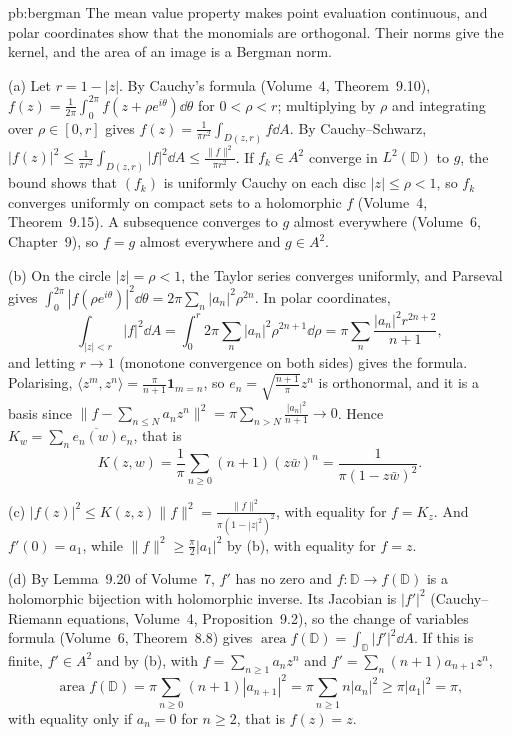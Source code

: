 \begin{solution}{pb:bergman}
\idea The mean value property makes point evaluation continuous, and polar coordinates show that the monomials are orthogonal. Their norms give the kernel, and the
area of an image is a Bergman norm.

\writeup (a) Let $r=1-|z|$. By Cauchy's formula (Volume~4, Theorem~9.10), $f(z)=\frac1{2\pi}\int_0^{2\pi}f(z+\rho e^{i\theta})\dd\theta$ for $0<\rho<r$; multiplying by $\rho$ and
integrating over $\rho\in[0,r]$ gives $f(z)=\frac1{\pi r^2}\int_{D(z,r)}f\dd A$. By Cauchy--Schwarz, $|f(z)|^2\le\frac1{\pi r^2}\int_{D(z,r)}|f|^2\dd A\le\frac{\|f\|^2}{\pi r^2}$. If
$f_k\in A^2$ converge in $L^2(\mathbb D)$ to $g$, the bound shows that $(f_k)$ is uniformly Cauchy on each disc $|z|\le\rho<1$, so $f_k$ converges uniformly on compact sets to a
holomorphic $f$ (Volume~4, Theorem~9.15). A subsequence converges to $g$ almost everywhere (Volume~6, Chapter~9), so $f=g$ almost everywhere and $g\in A^2$.

(b) On the circle $|z|=\rho<1$, the Taylor series converges uniformly, and Parseval gives $\int_0^{2\pi}|f(\rho e^{i\theta})|^2\dd\theta=2\pi\sum_n|a_n|^2\rho^{2n}$. In polar
coordinates,
\[
\int_{|z|<r}|f|^2\dd A=\int_0^r2\pi\sum_n|a_n|^2\rho^{2n+1}\dd\rho=\pi\sum_n\frac{|a_n|^2r^{2n+2}}{n+1},
\]
and letting $r\to1$ (monotone convergence on both sides) gives the formula. Polarising, $\langle z^m,z^n\rangle=\frac\pi{n+1}\mathbf 1_{m=n}$, so $e_n=\sqrt{\frac{n+1}\pi}z^n$ is orthonormal,
and it is a basis since $\|f-\sum_{n\le N}a_nz^n\|^2=\pi\sum_{n>N}\frac{|a_n|^2}{n+1}\to0$. Hence $K_w=\sum_n\overline{e_n(w)}e_n$, that is
\[
K(z,w)=\frac1\pi\sum_{n\ge0}(n+1)(z\bar w)^n=\frac1{\pi(1-z\bar w)^2}.
\]

(c) $|f(z)|^2\le K(z,z)\|f\|^2=\frac{\|f\|^2}{\pi(1-|z|^2)^2}$, with equality for $f=K_z$. And $f'(0)=a_1$, while $\|f\|^2\ge\frac\pi2|a_1|^2$ by (b), with equality for $f=z$.

(d) By Lemma~9.20 of Volume~7, $f'$ has no zero and $f:\mathbb D\to f(\mathbb D)$ is a holomorphic bijection with holomorphic inverse. Its Jacobian is $|f'|^2$ (Cauchy--Riemann equations, Volume~4,
Proposition~9.2), so the change of variables formula (Volume~6, Theorem~8.8) gives $\operatorname{area}f(\mathbb D)=\int_{\mathbb D}|f'|^2\dd A$. If this is finite, $f'\in A^2$ and by (b),
with $f=\sum_{n\ge1}a_nz^n$ and $f'=\sum_n(n+1)a_{n+1}z^n$,
\[
\operatorname{area}f(\mathbb D)=\pi\sum_{n\ge0}(n+1)|a_{n+1}|^2=\pi\sum_{n\ge1}n|a_n|^2\ge\pi|a_1|^2=\pi,
\]
with equality only if $a_n=0$ for $n\ge2$, that is $f(z)=z$.


\end{solution}
